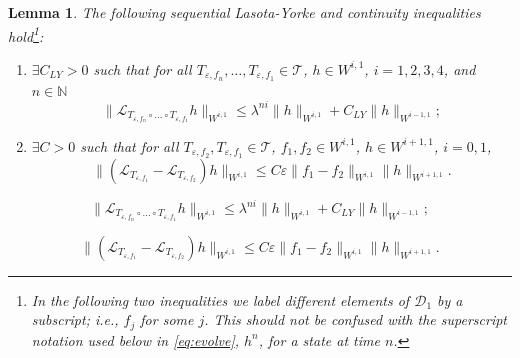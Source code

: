 \documentclass[10pt,a4paper]{amsart}
\newtheorem{lemma}{Lemma}
\def\L{\mathcal{L}}
\newcommand\cT{{\mathcal T}}
\newcommand{\eps}{\varepsilon}
\begin{document}
\begin{lemma}
    \label{introprop}
The following sequential Lasota-Yorke and continuity inequalities hold\footnote{In the following two inequalities we label different elements of $\mathcal{D}_1$ by a subscript; i.e., $f_j$ for some $j$. This should not be confused with the superscript notation used below in \eqref{eq:evolve}, $h^n$, for a state at time $n$.}: 
\begin{enumerate}
\item $\exists C_{LY}>0$ such that for all $T_{\eps,f_n},\dots,T_{\eps,f_1}\in\cT$, $h\in W^{i,1}$, $i=1,2,3,4$, and $n\in\mathbb N$
\begin{equation}\label{eq:seqLY}
\|\L_{ T_{\eps,f_n}\circ\dots\circ T_{\eps,f_1}} h\|_{W^{i,1}}\leq \lambda^{ni}\|h\|_{W^{i,1}}+ C_{LY}\|h\|_{W^{i-1,1}};
\end{equation}
\item $\exists C>0$ such that for all $T_{\eps,f_2},T_{\eps,f_1}\in\cT$, $f_1,f_2\in W^{i,1}$, $h\in W^{i+1,1}$, $i=0,1$,
\begin{equation}\label{eq:closeop}
\|(\L_{T_{\eps, f_1}}-\L_{T_{\eps,f_2}})h\|_{W^{i,1}} \leq  C\eps \|f_1-f_2\|_{W^{i,1}} \|h\|_{W^{i+1,1}}.
\end{equation}
\end{enumerate}
\end{lemma}

\begin{equation}
\|\L_{ T_{\eps,f_n}\circ\dots\circ T_{\eps,f_1}} h\|_{W^{i,1}}\leq \lambda^{ni}\|h\|_{W^{i,1}}+ C_{LY}\|h\|_{W^{i-1,1}};
\end{equation}

\begin{equation}
\|(\L_{T_{\eps, f_1}}-\L_{T_{\eps,f_2}})h\|_{W^{i,1}} \leq  C\eps \|f_1-f_2\|_{W^{i,1}} \|h\|_{W^{i+1,1}}.
\end{equation}
\end{document}
